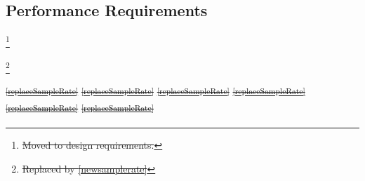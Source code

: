 \documentclass[a4paper,12pt,twoside]{article}
\providecommand{\DIFdeltex}[1]{{\protect\color{red}\sout{#1}}}                      %
\providecommand{\DIFdelbegin}{} %
\providecommand{\DIFdel}[1]{\texorpdfstring{\DIFdeltex{#1}}{}} %
\newcommand{\DIFscaledelfig}{0.5}
\newlength{\DIFdelgraphicswidth} %
\newlength{\DIFdelgraphicsheight} %
\newcommand{\DIFdelincludegraphics}[2][]{%
\sbox{\DIFdelgraphicsbox}{\DIFOincludegraphics[#1]{#2}}%
\settoboxwidth{\DIFdelgraphicswidth}{\DIFdelgraphicsbox} %
\settoboxtotalheight{\DIFdelgraphicsheight}{\DIFdelgraphicsbox} %
\scalebox{\DIFscaledelfig}{%
\parbox[b]{\DIFdelgraphicswidth}{\usebox{\DIFdelgraphicsbox}\\[-\baselineskip] \rule{\DIFdelgraphicswidth}{0em}}\llap{\resizebox{\DIFdelgraphicswidth}{\DIFdelgraphicsheight}{%
\setlength{\unitlength}{\DIFdelgraphicswidth}%
\begin{picture}(1,1)%
\thicklines\linethickness{2pt} %
{\color[rgb]{1,0,0}\put(0,0){\framebox(1,1){}}}%
{\color[rgb]{1,0,0}\put(0,0){\line( 1,1){1}}}%
{\color[rgb]{1,0,0}\put(0,1){\line(1,-1){1}}}%
\end{picture}%
}\hspace*{3pt}}} %
} %
\DeclareRobustCommand{\DIFdelbegin}{\DIFOdelbegin \let\includegraphics\DIFdelincludegraphics} %
\begin{document}
\subsection{Performance Requirements}

\DIFdelbegin %
\footnote{\DIFdel{Moved to design requirements.}%
}
\addtocounter{footnote}{-1}%
\footnote{\DIFdel{Replaced by \ref{newsamplerate}}%
}
\addtocounter{footnote}{-1}%
\DIFdel{\textsuperscript{\ref{replaceSampleRate}}
    }%
\DIFdel{\textsuperscript{\ref{replaceSampleRate}}
    }%
\DIFdel{\textsuperscript{\ref{replaceSampleRate}}
    }%
\DIFdel{\textsuperscript{\ref{replaceSampleRate}}
    }%
\DIFdel{\textsuperscript{\ref{replaceSampleRate}}
    }%
\DIFdel{\textsuperscript{\ref{replaceSampleRate}}
    }%
\end{document}
